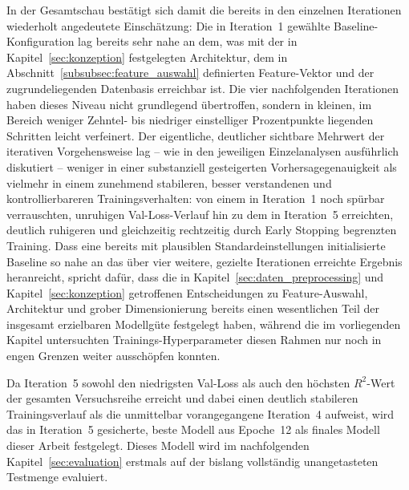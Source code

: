 In der Gesamtschau bestätigt sich damit die bereits in den einzelnen Iterationen wiederholt angedeutete Einschätzung: Die in Iteration~1 gewählte Baseline-Konfiguration lag bereits sehr nahe an dem, was mit der in Kapitel~\ref{sec:konzeption} festgelegten Architektur, dem in Abschnitt~\ref{subsubsec:feature_auswahl} definierten Feature-Vektor und der zugrundeliegenden Datenbasis erreichbar ist. Die vier nachfolgenden Iterationen haben dieses Niveau nicht grundlegend übertroffen, sondern in kleinen, im Bereich weniger Zehntel- bis niedriger einstelliger Prozentpunkte liegenden Schritten leicht verfeinert. Der eigentliche, deutlicher sichtbare Mehrwert der iterativen Vorgehensweise lag -- wie in den jeweiligen Einzelanalysen ausführlich diskutiert -- weniger in einer substanziell gesteigerten Vorhersagegenauigkeit als vielmehr in einem zunehmend stabileren, besser verstandenen und kontrollierbareren Trainingsverhalten: von einem in Iteration~1 noch spürbar verrauschten, unruhigen Val-Loss-Verlauf hin zu dem in Iteration~5 erreichten, deutlich ruhigeren und gleichzeitig rechtzeitig durch Early Stopping begrenzten Training. Dass eine bereits mit plausiblen Standardeinstellungen initialisierte Baseline so nahe an das über vier weitere, gezielte Iterationen erreichte Ergebnis heranreicht, spricht dafür, dass die in Kapitel~\ref{sec:daten_preprocessing} und Kapitel~\ref{sec:konzeption} getroffenen Entscheidungen zu Feature-Auswahl, Architektur und grober Dimensionierung bereits einen wesentlichen Teil der insgesamt erzielbaren Modellgüte festgelegt haben, während die im vorliegenden Kapitel untersuchten Trainings-Hyperparameter diesen Rahmen nur noch in engen Grenzen weiter ausschöpfen konnten.

Da Iteration~5 sowohl den niedrigsten Val-Loss als auch den höchsten $R^2$-Wert der gesamten Versuchsreihe erreicht und dabei einen deutlich stabileren Trainingsverlauf als die unmittelbar vorangegangene Iteration~4 aufweist, wird das in Iteration~5 gesicherte, beste Modell aus Epoche~12 als finales Modell dieser Arbeit festgelegt. Dieses Modell wird im nachfolgenden Kapitel~\ref{sec:evaluation} erstmals auf der bislang vollständig unangetasteten Testmenge evaluiert.